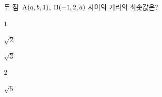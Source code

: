 두 점~$\mathrm{A}(a{,}\mkern3mu\mathopen{}b{,}\mkern3mu\mathopen{}1)$, $\mathrm{B}(-1{,}\mkern3mu\mathopen{}2{,}\mkern3mu\mathopen{}a)$ 사이의 거리의 최솟값은?
\begin{choices32}{\rule[-3ex]{0pt}{8ex}$1$}{\rule[-3ex]{0pt}{8ex}$\sqrt{2}$}{\rule[-3ex]{0pt}{8ex}$\sqrt{3}$}{\rule[-3ex]{0pt}{8ex}$2$}{\rule[-3ex]{0pt}{8ex}$\sqrt{5}$}\end{choices32}

